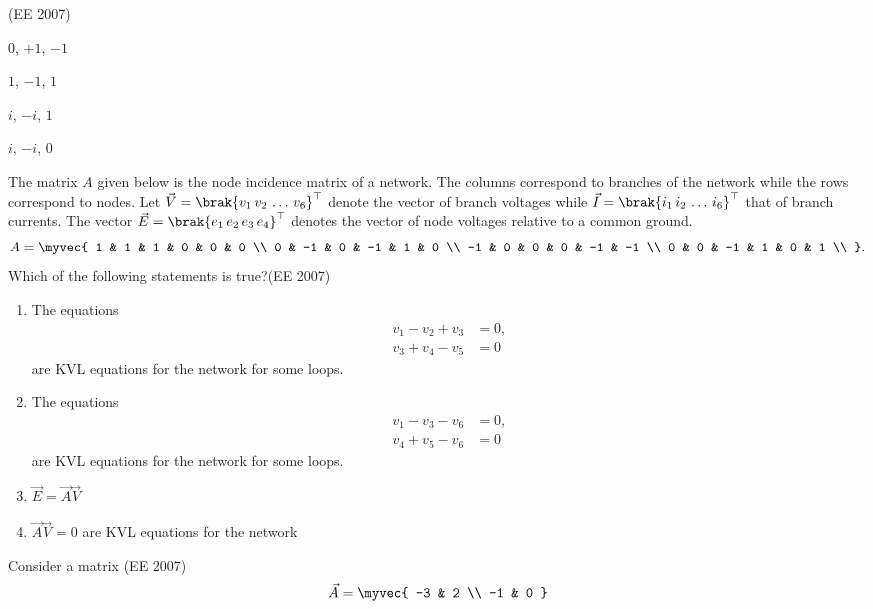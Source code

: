 \hfill{(EE 2007)} 
\begin{enumerate}
\begin{multicols}{4}
    \item $0$, $+1$, $-1$
    \item $1$, $-1$, $1$
    \item $i$, $-i$, $1$
    \item $i$, $-i$, $0$
    \end{multicols}
\end{enumerate}
%
\item  
The matrix $A$ given below is the node incidence matrix of a network. The columns correspond to branches of the network while the rows correspond to nodes. Let $\vec{V} = \brak{v_1\, v_2\, \ldots\, v_6}^{\top}$ denote the vector of branch voltages while $\vec{I} = \brak{i_1\, i_2\, \ldots\, i_6}^{\top}$ that of branch currents. The vector $\vec{E} = \brak{e_1\, e_2\, e_3\, e_4}^{\top}$ denotes the vector of node voltages relative to a common ground.
$$ A =
\myvec{
1 & 1 & 1 & 0 & 0 & 0 \\
0 & -1 & 0 & -1 & 1 & 0 \\
-1 & 0 & 0 & 0 & -1 & -1 \\
0 & 0 & -1 & 1 & 0 & 1 \\
}.
$$
Which of the following statements is true?\hfill{(EE 2007)}
\begin{enumerate}
    \item The equations
	    \begin{align*}
        v_1 - v_2 + v_3 &= 0, \\ v_3 + v_4 - v_5 &= 0
\end{align*}
        are KVL equations for the network for some loops.
    \item The equations
	    \begin{align*}
        v_1 - v_3 - v_6 &= 0, \\ v_4 + v_5 - v_6 &= 0
\end{align*}
        are KVL equations for the network for some loops.
    \item $\vec{E} = \vec{A}\vec{V}$
    \item $\vec{A}\vec{V} = 0$ are KVL equations for the network
\end{enumerate}
%
\item 
Consider a matrix
\hfill{(EE 2007)}
$$
\vec{A} =
\myvec{
-3 & 2 \\
-1 & 0
}
$$

